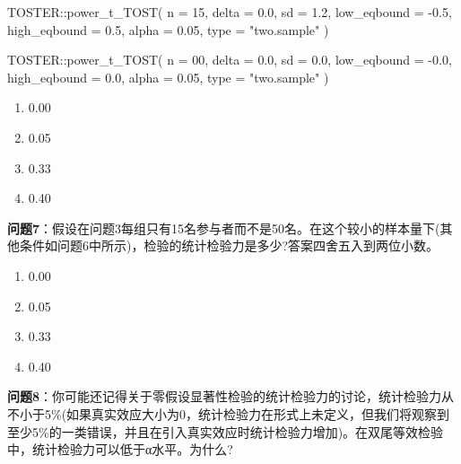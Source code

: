 \documentclass[
  letterpaper,
  DIV=11,
  numbers=noendperiod]{scrreprt}
\newenvironment{Shaded}{\begin{snugshade}}{\end{snugshade}}
\newcommand{\AttributeTok}[1]{\textcolor[rgb]{0.40,0.45,0.13}{#1}}
\newcommand{\DecValTok}[1]{\textcolor[rgb]{0.68,0.00,0.00}{#1}}
\newcommand{\FloatTok}[1]{\textcolor[rgb]{0.68,0.00,0.00}{#1}}
\newcommand{\FunctionTok}[1]{\textcolor[rgb]{0.28,0.35,0.67}{#1}}
\newcommand{\NormalTok}[1]{\textcolor[rgb]{0.00,0.23,0.31}{#1}}
\newcommand{\SpecialCharTok}[1]{\textcolor[rgb]{0.37,0.37,0.37}{#1}}
\newcommand{\StringTok}[1]{\textcolor[rgb]{0.13,0.47,0.30}{#1}}
\providecommand{\tightlist}{%
  \setlength{\itemsep}{0pt}\setlength{\parskip}{0pt}}\usepackage{longtable,booktabs,array}
\begin{document}
\begin{Shaded}
\begin{Highlighting}[]
\NormalTok{TOSTER}\SpecialCharTok{::}\FunctionTok{power\_t\_TOST}\NormalTok{(}
  \AttributeTok{n =} \DecValTok{15}\NormalTok{,}
  \AttributeTok{delta =} \FloatTok{0.0}\NormalTok{,}
  \AttributeTok{sd =} \FloatTok{1.2}\NormalTok{,}
  \AttributeTok{low\_eqbound =} \SpecialCharTok{{-}}\FloatTok{0.5}\NormalTok{,}
  \AttributeTok{high\_eqbound =} \FloatTok{0.5}\NormalTok{,}
  \AttributeTok{alpha =} \FloatTok{0.05}\NormalTok{,}
  \AttributeTok{type =} \StringTok{"two.sample"}
\NormalTok{)}
\end{Highlighting}
\end{Shaded}

\begin{Shaded}
\begin{Highlighting}[]
\NormalTok{TOSTER}\SpecialCharTok{::}\FunctionTok{power\_t\_TOST}\NormalTok{(}
  \AttributeTok{n =} \DecValTok{00}\NormalTok{,}
  \AttributeTok{delta =} \FloatTok{0.0}\NormalTok{,}
  \AttributeTok{sd =} \FloatTok{0.0}\NormalTok{,}
  \AttributeTok{low\_eqbound =} \SpecialCharTok{{-}}\FloatTok{0.0}\NormalTok{,}
  \AttributeTok{high\_eqbound =} \FloatTok{0.0}\NormalTok{,}
  \AttributeTok{alpha =} \FloatTok{0.05}\NormalTok{,}
  \AttributeTok{type =} \StringTok{"two.sample"}
\NormalTok{)}
\end{Highlighting}
\end{Shaded}

\begin{enumerate}
\def\labelenumi{\Alph{enumi})}
\tightlist
\item
  0.00
\item
  0.05
\item
  0.33
\item
  0.40
\end{enumerate}

\textbf{问题7}：假设在问题3每组只有15名参与者而不是50名。在这个较小的样本量下(其他条件如问题6中所示)，检验的统计检验力是多少?答案四舍五入到两位小数。

\begin{enumerate}
\def\labelenumi{\Alph{enumi})}
\tightlist
\item
  0.00
\item
  0.05
\item
  0.33
\item
  0.40
\end{enumerate}

\textbf{问题8}：你可能还记得关于零假设显著性检验的统计检验力的讨论，统计检验力从不小于5\%(如果真实效应大小为0，统计检验力在形式上未定义，但我们将观察到至少5\%的一类错误，并且在引入真实效应时统计检验力增加)。在双尾等效检验中，统计检验力可以低于α水平。为什么?
\end{document}
